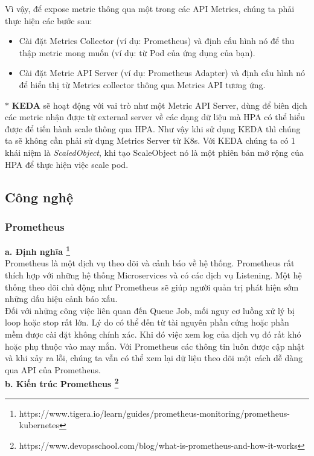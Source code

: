 Vì vậy, để expose metric thông qua một trong các API Metrics, chúng ta phải thực hiện các bước sau:
\begin{itemize}
    \item Cài đặt Metrics Collector (ví dụ: Prometheus) và định cấu hình nó để thu thập metric mong muốn (ví dụ: từ Pod của ứng dụng của bạn).
    \item Cài đặt Metric API Server (ví dụ: Prometheus Adapter) và định cấu hình nó để hiển thị từ Metrics collector thông qua Metrics API tương ứng.
\end{itemize}
$\ast$ \textbf{KEDA} sẽ hoạt động với vai trò như một Metric API Server, dùng để biên dịch các metric nhận được từ external server về các dạng dữ liệu mà HPA có thể hiểu được để tiến hành scale thông qua HPA. Như vậy khi sử dụng KEDA thì chúng ta sẽ không cần phải sử dụng Metrics Server từ K8s. Với KEDA chúng ta có 1 khái niệm là \textit{ScaledObject}, khi tạo ScaleObject nó là một phiên bản mở rộng của HPA để thực hiện việc scale pod.
\subsection{Công nghệ}
\subsubsection{Prometheus}
\textbf{a. Định nghĩa \footnote{https://www.tigera.io/learn/guides/prometheus-monitoring/prometheus-kubernetes}}\\[0.5cm]
Prometheus là một dịch vụ theo dõi và cảnh báo về hệ thống. Prometheus rất thích hợp với những hệ thống Microservices và có các dịch vụ Listening. Một hệ thống theo dõi chủ động như Prometheus sẽ giúp người quản trị phát hiện sớm những dấu hiệu cảnh báo xấu.\\[0.5cm]
Đối với những công việc liên quan đến Queue Job, mối nguy cơ luồng xử lý bị loop hoặc stop rất lớn. Lý do có thể đến từ tài nguyên phần cứng hoặc phần mềm được cài đặt không chính xác. Khi đó việc xem log của dịch vụ đó rất khó hoặc phụ thuộc vào may mắn. Với Prometheus các thông tin luôn được cập nhật và khi xảy ra lỗi, chúng ta vẫn có thể xem lại dữ liệu theo dõi một cách dễ dàng qua API của Prometheus.\\[0.5cm]
\textbf{b. Kiến trúc Prometheus \footnote{https://www.devopsschool.com/blog/what-is-prometheus-and-how-it-works}}

